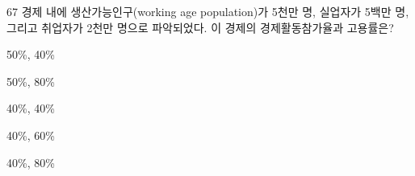 \begin{question}{67}
경제 내에 생산가능인구(working age population)가 5천만 명, 실업자가 5백만 명, 그리고 취업자가 2천만 명으로 파악되었다. 이 경제의 경제활동참가율과 고용률은?
\begin{choices}
  \item 50\%, 40\%
  \item 50\%, 80\%
  \item 40\%, 40\%
  \item 40\%, 60\%
  \item 40\%, 80\%
\end{choices}
\end{question}
